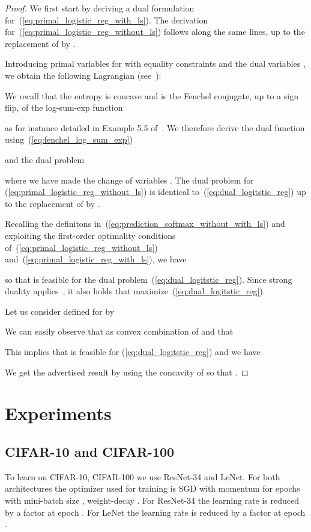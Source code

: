\documentclass[twoside,11pt]{article}
\begin{document}
\begin{proof}
We first start by deriving a dual formulation for~(\ref{eq:primal_logistic_reg_with_ls}). The derivation for~(\ref{eq:primal_logistic_reg_without_ls}) follows along the same lines, up to the replacement of  by .

Introducing primal variables  for  with equality constraints  and the dual variables , we obtain the following Lagrangian (see~\citet{boyd2004convex}):

We recall that the entropy is concave and is the Fenchel conjugate, up to a sign flip, of the log-sum-exp function

as for instance detailed in Example 5.5 of~\citep{boyd2004convex}. We therefore derive the dual function using~(\ref{eq:fenchel_log_sum_exp})

and the dual problem

where we have made the change of variables . The dual problem for (\ref{eq:primal_logistic_reg_without_ls}) is identical to~(\ref{eq:dual_logitstic_reg}) up to the replacement of  by .

Recalling the definitons in~(\ref{eq:prediction_softmax_without_with_ls}) and exploiting the first-order optimality conditions of~(\ref{eq:primal_logistic_reg_without_ls}) and~(\ref{eq:primal_logistic_reg_with_ls}), we have

so that  is feasible for the dual problem~(\ref{eq:dual_logitstic_reg}).
Since strong duality applies~\citep{boyd2004convex}, it also holds that  maximize~(\ref{eq:dual_logitstic_reg}).

Let us consider  defined for  by

We can easily observe that  as convex combination of  and that

This implies that  is feasible for (\ref{eq:dual_logitstic_reg}) and we have

We get the advertised result by using the concavity of  so that .
\end{proof}




\section{Experiments}\label{sec:app_exp}
\subsection{CIFAR-10 and CIFAR-100}
To learn on CIFAR-10, CIFAR-100 we use ResNet-34 and LeNet.
For both architectures the optimizer used for training is SGD with momentum  for  epochs 
with mini-batch size , weight-decay .
For ResNet-34 the learning rate is  reduced by a factor  at epoch .
For LeNet the learning rate is  reduced by a factor  at epoch .
\end{document}
